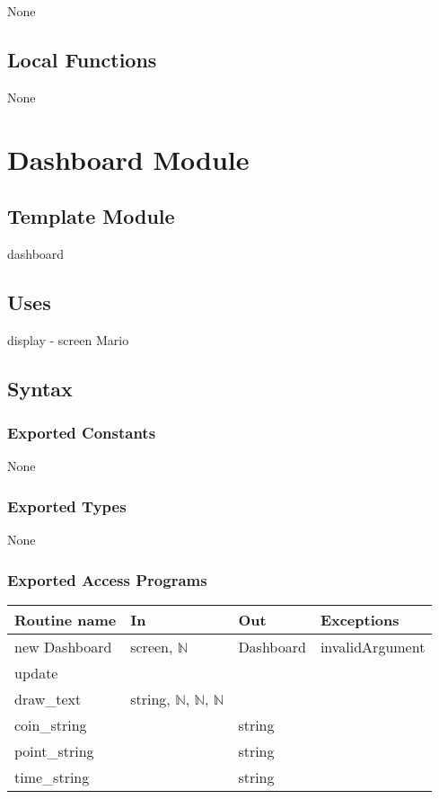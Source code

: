 \documentclass[12pt]{article}
\begin{document}
None

\subsection {Local Functions}

None

\newpage

\section {Dashboard Module}

\subsection{Template Module}

dashboard

\subsection {Uses}

display - screen
Mario

\subsection {Syntax}

\subsubsection {Exported Constants}

None

\subsubsection {Exported Types}

None

\subsubsection {Exported Access Programs}

\begin{tabular}{| l | l | l | l |}
\hline
\textbf{Routine name} & \textbf{In} & \textbf{Out} & \textbf{Exceptions}\\
\hline
new Dashboard & screen, $\mathbb{N}$ & Dashboard & invalidArgument\\
\hline
update & & & \\
\hline
draw\_text & string, $\mathbb{N}$, $\mathbb{N}$, $\mathbb{N}$ & & \\
\hline
coin\_string & & string & \\
\hline
point\_string & & string & \\
\hline
time\_string & & string & \\
\hline
\end{tabular}
\end{document}
